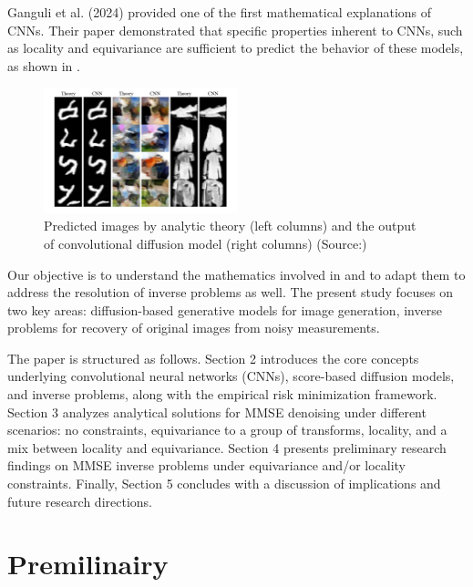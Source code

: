 \documentclass[a4paper,10pt]{article}
\theoremstyle{definition} %
\theoremstyle{definition} %
\theoremstyle{definition} %
\theoremstyle{definition} %
\newcommand{\0}{\boldsymbol{0}}
\begin{document}
Ganguli et al. (2024) \cite{kamb2024analytictheorycreativityconvolutional} provided one of the first mathematical explanations of CNNs. Their paper demonstrated that specific properties inherent to CNNs, such as locality and equivariance are sufficient to predict the behavior of these models, as shown in .
\begin{figure}[h] %
    \centering
    \includegraphics[width=0.5\textwidth]{../images/introduction_Ganguli.png} %
    \caption{Predicted images by analytic theory (left columns) and the output of convolutional diffusion model (right columns) (Source:\cite{kamb2024analytictheorycreativityconvolutional})}
    \label{fig:introduction_im}
\end{figure}

Our objective is to understand the mathematics involved in \cite{kamb2024analytictheorycreativityconvolutional} and to adapt them to address the resolution of inverse problems as well. The present study focuses on two key areas: diffusion-based generative models for image generation, inverse problems for recovery of original images from noisy measurements.

The paper is structured as follows. Section 2 introduces the core concepts underlying convolutional neural networks (CNNs), score-based diffusion models, and inverse problems, along with the empirical risk minimization framework. Section 3 analyzes analytical solutions for MMSE denoising  under different scenarios: no constraints, equivariance to a group of transforms, locality, and a mix between locality and equivariance. Section 4 presents preliminary research findings on MMSE inverse problems under  equivariance and/or locality constraints. Finally, Section 5 concludes with a discussion of implications and future research directions.

\section{Premilinairy}
\end{document}
